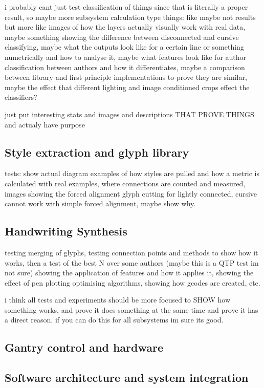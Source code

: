 i probably cant just test classification of things since that is literally a proper result, so maybe more subsystem calculation type things: like maybe not results but more like images of how the layers actually visually work with real data, maybe something showing the difference between disconnected and cursive classifying, maybe what the outputs look like for a certain line or something numetrically and how to analyse it, maybe what features look like for author classification between authors and how it differentiates, maybe a comparison between library and first principle implementations to prove they are similar, maybe the effect that different lighting and image conditioned crops effect the classifiers?

just put interesting stats and images and descriptions THAT PROVE THINGS and actualy have purpose
\subsection{Style extraction and glyph library}

tests: show actual diagram examples of how styles are pulled and how a metric is calculated with real examples, where connections are counted and measured, images showing the forced alignment glyph cutting for lightly connected, cursive cannot work with simple forced alignment, maybe show why. 
\subsection{Handwriting Synthesis}
testing merging of glyphs, testing connection points and methods to show how it works, then a test of the best N over some authors (maybe this is a QTP test im not sure)
showing the application of features and how it applies it, showing the effect of pen plotting optimising algorithms, showing how gcodes are created, etc.

i think all tests and experiments should be more focused to SHOW how something works, and prove it does something at the same time and prove it has a direct reason. if you can do this for all subsystems im sure its good.
\subsection{Gantry control and hardware}

\subsection{Software architecture and system integration}
